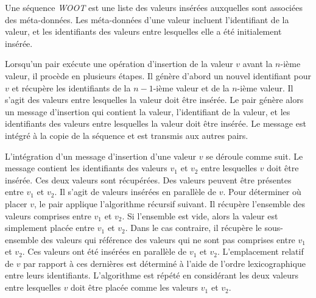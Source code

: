 Une séquence \emph{WOOT} est une liste des valeurs insérées auxquelles sont associées des méta-données.
Les méta-données d'une valeur incluent l'identifiant de la valeur, et les identifiants des valeurs entre lesquelles elle a été initialement insérée.

Lorsqu'un pair exécute une opération d'insertion de la valeur $v$ avant la $n$-ième valeur, il procède en plusieurs étapes.
Il génère d'abord un nouvel identifiant pour $v$ et récupère les identifiants de la $n-1$-ième valeur et de la $n$-ième valeur.
Il s'agit des valeurs entre lesquelles la valeur doit être insérée.
Le pair génère alors un message d'insertion qui contient la valeur, l'identifiant de la valeur, et les identifiants des valeurs entre lesquelles la valeur doit être insérée.
Le message est intégré à la copie de la séquence et est transmis aux autres pairs.

L'intégration d'un message d'insertion d'une valeur $v$ se déroule comme suit.
Le message contient les identifiants des valeurs $v_1$ et $v_2$ entre lesquelles $v$ doit être insérée.
Ces deux valeurs sont récupérées.
Des valeurs peuvent être présentes entre $v_1$ et $v_2$.
Il s'agit de valeurs insérées en parallèle de $v$.
Pour déterminer où placer $v$, le pair applique l'algorithme récursif suivant.
Il récupère l'ensemble des valeurs comprises entre $v_1$ et $v_2$.
Si l'ensemble est vide, alors la valeur est simplement placée entre $v_1$ et $v_2$.
Dans le cas contraire, il récupère le sous-ensemble des valeurs qui référence des valeurs qui ne sont pas comprises entre $v_1$ et $v_2$.
Ces valeurs ont été insérées en parallèle de $v_1$ et $v_2$.
L'emplacement relatif de $v$ par rapport à ces dernières est déterminé à l'aide de l'ordre lexicographique entre leurs identifiants.
L'algorithme est répété en considérant les deux valeurs entre lesquelles $v$ doit être placée comme les valeurs $v_1$ et $v_2$.

